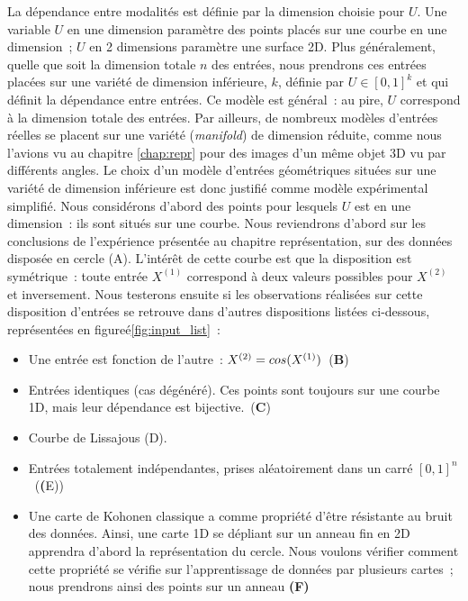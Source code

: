 \documentclass[../main]{subfiles}
\begin{document}
La dépendance entre modalités est définie par la dimension choisie pour $U$.
Une variable $U$ en une dimension paramètre des points placés sur une courbe en une dimension~; $U$ en 2 dimensions paramètre une surface 2D. 
Plus généralement, quelle que soit la dimension totale $n$ des entrées, nous prendrons ces entrées placées sur une variété de dimension inférieure, $k$,  définie par $U \in [0,1]^k$ et qui définit la dépendance entre entrées. 
Ce modèle est général~: au pire, $U$ correspond à la dimension totale des entrées. Par ailleurs, de nombreux modèles d'entrées réelles se placent sur une variété (\emph{manifold}) de dimension réduite, comme nous l'avions vu au chapitre \ref{chap:repr} pour des images d'un même objet 3D vu par différents angles. Le choix d'un modèle d'entrées géométriques situées sur une variété de dimension inférieure est donc justifié comme modèle expérimental simplifié.
Nous considérons d'abord des points pour lesquels $U$ est en une dimension~: ils sont situés sur une courbe. 
Nous reviendrons d'abord  sur les conclusions de l'expérience présentée au chapitre représentation, sur des données disposée en cercle (A). L'intérêt de cette courbe est que la disposition est symétrique~: toute entrée $X^{(1)}$ correspond à deux valeurs possibles pour $X^{(2)}$ et inversement.
Nous testerons ensuite si les observations réalisées sur cette disposition d'entrées se retrouve dans d'autres dispositions listées ci-dessous, représentées en figureé\ref{fig:input_list}~:
\begin{itemize}
	\item Une entrée est fonction de l'autre~: $X^{({2})} = cos(X^{({1})})$~(\textbf{B})
	\item Entrées identiques (cas dégénéré). Ces points sont toujours sur une courbe 1D, mais leur dépendance est bijective.~(\textbf{C})
	\item Courbe de Lissajous (D).
	\item Entrées totalement indépendantes, prises aléatoirement dans un carré $[0,1]^n$~(\textbf({E}))
	\item Une carte de Kohonen classique a comme propriété d'être résistante au bruit des données. Ainsi, une carte 1D se dépliant sur un anneau fin en 2D apprendra d'abord la représentation du cercle. Nous voulons vérifier comment cette propriété se vérifie sur l'apprentissage de données par plusieurs cartes~; nous prendrons ainsi des points sur un anneau \textbf{(F)}
\end{itemize}
\end{document}

